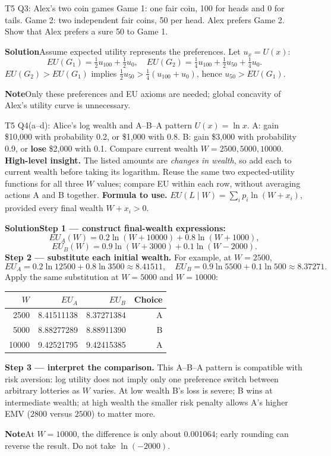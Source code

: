 \documentclass[10pt,a4paper]{article}
\newcommand{\ans}{\par\smallskip\textbf{\color{good}Solution\quad}}
\newcommand{\pit}{\par\smallskip\textbf{\color{warn}Note\quad}}
\begin{document}
\begin{question}{T5 Q3: Alex's two coin games}\label{q:t5q3}
Game 1: one fair coin, 100 for heads and 0 for tails. Game 2: two independent fair coins, 50 per head. Alex prefers Game 2. Show that Alex prefers a sure 50 to Game 1.
\ans Assume expected utility represents the preferences. Let $u_x=U(x)$:
\[
EU(G_1)=\tfrac12u_{100}+\tfrac12u_0,
\quad EU(G_2)=\tfrac14u_{100}+\tfrac12u_{50}+\tfrac14u_0.
\]
$EU(G_2)>EU(G_1)$ implies $\frac12u_{50}>\frac14(u_{100}+u_0)$, hence $u_{50}>EU(G_1)$.
\pit Only these preferences and EU axioms are needed; global concavity of Alex's utility curve is unnecessary.
\end{question}

\begin{question}{T5 Q4(a--d): Alice's log wealth and A--B--A pattern}\label{q:t5q4}
$U(x)=\ln x$. A: gain \$10,000 with probability 0.2, or \$1,000 with 0.8. B: gain \$3,000 with probability 0.9, or \textbf{lose} \$2,000 with 0.1. Compare current wealth $W=2500,5000,10000$.
\textbf{High-level insight.} The listed amounts are \emph{changes in wealth}, so add each to current wealth before taking its logarithm. Reuse the same two expected-utility functions for all three $W$ values; compare EU within each row, without averaging actions A and B together.
\textbf{Formula to use.} $EU(L\mid W)=\sum_i p_i\ln(W+x_i)$, provided every final wealth $W+x_i>0$.
\ans \textbf{Step 1 --- construct final-wealth expressions:}
\[
EU_A(W)=0.2\ln(W+10000)+0.8\ln(W+1000),
\]
\[
EU_B(W)=0.9\ln(W+3000)+0.1\ln(W-2000).
\]
\textbf{Step 2 --- substitute each initial wealth.} For example, at $W=2500$,
\[
EU_A=0.2\ln12500+0.8\ln3500\approx8.41511,\quad
EU_B=0.9\ln5500+0.1\ln500\approx8.37271.
\]
Apply the same substitution at $W=5000$ and $W=10000$:
\begin{center}
\begin{tabular}{@{}rrrr@{}}
\toprule $W$ & $EU_A$ & $EU_B$ & Choice \\\midrule
2500 & 8.41511138 & 8.37271384 & A \\
5000 & 8.88277289 & 8.88911390 & B \\
10000 & 9.42521795 & 9.42415385 & A \\\bottomrule
\end{tabular}
\end{center}
\textbf{Step 3 --- interpret the comparison.} This A--B--A pattern is compatible with risk aversion: log utility does not imply only one preference switch between arbitrary lotteries as $W$ varies. At low wealth B's loss is severe; B wins at intermediate wealth; at high wealth the smaller risk penalty allows A's higher EMV ($2800$ versus $2500$) to matter more.
\pit At $W=10000$, the difference is only about 0.001064; early rounding can reverse the result. Do not take $\ln(-2000)$.
\end{question}
\end{document}
